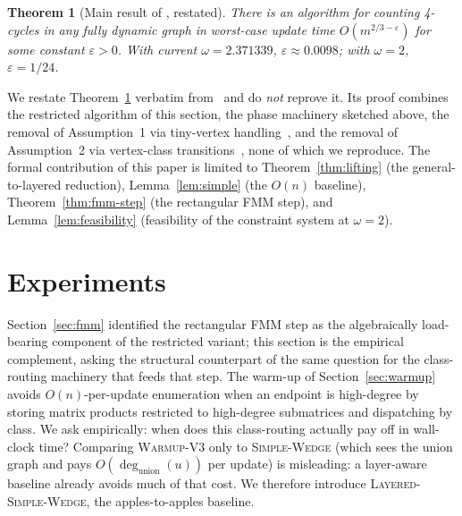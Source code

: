 \documentclass[sigconf,nonacm]{acmart}
\theoremstyle{plain}
\newtheorem{theorem}{Theorem}
\theoremstyle{definition}
\begin{document}
\begin{theorem}[Main result of \cite{AssadiShah25}, restated]
\label{thm:main-paper}
There is an algorithm for counting 4-cycles in any fully dynamic graph in worst-case update time $O(m^{2/3-\varepsilon})$ for some constant $\varepsilon > 0$. With current $\omega = 2.371339$, $\varepsilon \approx 0.0098$; with $\omega = 2$, $\varepsilon = 1/24$.
\end{theorem}

We restate Theorem~\ref{thm:main-paper} verbatim
from~\cite{AssadiShah25} and do \emph{not} reprove it. Its proof
combines the restricted algorithm of this section, the phase machinery sketched
above, the removal of Assumption~1 via tiny-vertex
handling~\cite[\S6]{AssadiShah25}, and the removal of Assumption~2
via vertex-class transitions~\cite[\S7]{AssadiShah25}, none of
which we reproduce. The formal contribution of this paper is
limited to Theorem~\ref{thm:lifting} (the general-to-layered
reduction), Lemma~\ref{lem:simple} (the $O(n)$ baseline),
Theorem~\ref{thm:fmm-step} (the rectangular FMM step), and
Lemma~\ref{lem:feasibility} (feasibility of the constraint system
at $\omega = 2$).

\section{Experiments}
\label{sec:experiments}

Section~\ref{sec:fmm} identified the rectangular FMM step as the
algebraically load-bearing component of the restricted variant; this
section is the empirical complement, asking the structural counterpart
of the same question for the class-routing machinery that feeds that
step. The warm-up of Section~\ref{sec:warmup} avoids $O(n)$-per-update
enumeration when an endpoint is high-degree by storing matrix products
restricted to high-degree submatrices and dispatching by class. We ask
empirically: when does this class-routing actually pay off in
wall-clock time? Comparing \textsc{Warmup-V3} only to
\textsc{Simple-Wedge} (which sees the union graph and pays
$O(\deg_{\text{union}}(u))$ per update) is misleading: a layer-aware
baseline already avoids much of that cost. We therefore introduce
\textsc{Layered-Simple-Wedge}, the apples-to-apples baseline.
\end{document}
